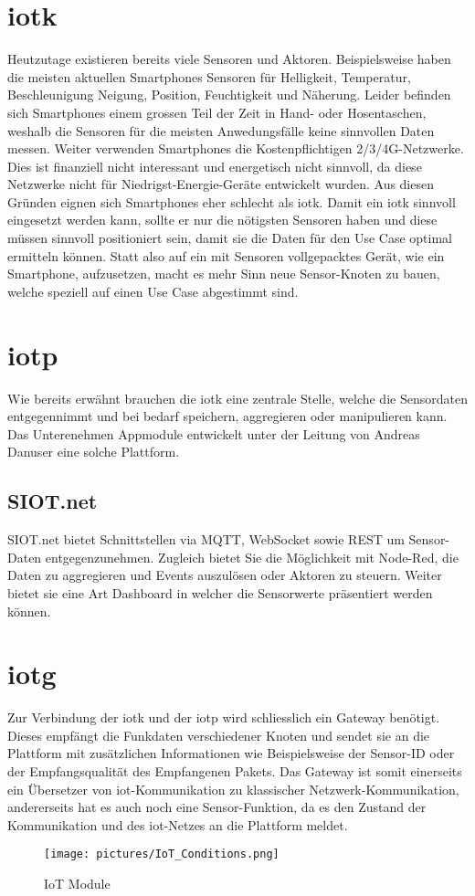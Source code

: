 \section{\gls{iotk}}
Heutzutage existieren bereits viele Sensoren und Aktoren. Beispielsweise haben die meisten aktuellen Smartphones Sensoren für Helligkeit, Temperatur, Beschleunigung Neigung, Position, Feuchtigkeit und Näherung. Leider befinden sich Smartphones einem grossen Teil der Zeit in Hand- oder Hosentaschen, weshalb die Sensoren für die meisten Anwedungsfälle keine sinnvollen Daten messen. Weiter verwenden  Smartphones die Kostenpflichtigen 2/3/4G-Netzwerke. Dies ist finanziell nicht interessant und energetisch nicht sinnvoll, da diese Netzwerke nicht für Niedrigst-Energie-Geräte entwickelt wurden. Aus diesen Gründen eignen sich Smartphones eher schlecht als \gls{iotk}. Damit ein \gls{iotk} sinnvoll eingesetzt werden kann, sollte er nur die nötigsten Sensoren haben und diese müssen sinnvoll positioniert sein, damit sie die Daten für den Use Case optimal ermitteln können. Statt also auf ein mit Sensoren vollgepacktes Gerät, wie ein Smartphone, aufzusetzen, macht es mehr Sinn neue Sensor-Knoten zu bauen, welche speziell auf einen Use Case abgestimmt sind.

\section{\gls{iotp}}
Wie bereits erwähnt brauchen die \gls{iotk} eine zentrale Stelle, welche die Sensordaten entgegennimmt und bei bedarf speichern, aggregieren oder manipulieren kann. Das Unterenehmen Appmodule entwickelt unter der Leitung von Andreas Danuser eine solche Plattform. 
\subsection{SIOT.net}
SIOT.net bietet Schnittstellen via MQTT, WebSocket sowie REST um Sensor-Daten entgegenzunehmen. Zugleich bietet Sie die Möglichkeit mit Node-Red, die Daten zu aggregieren und Events auszulösen oder Aktoren zu steuern. Weiter bietet sie eine Art Dashboard in welcher die Sensorwerte präsentiert werden können.

\section{\gls{iotg}}
Zur Verbindung der \gls{iotk} und der \gls{iotp} wird schliesslich ein Gateway benötigt. Dieses empfängt die Funkdaten verschiedener Knoten und sendet sie an die Plattform mit zusätzlichen Informationen wie Beispielsweise der Sensor-ID oder der Empfangsqualität des Empfangenen Pakets. Das Gateway ist somit einerseits ein Übersetzer von \gls{iot}-Kommunikation zu klassischer Netzwerk-Kommunikation, andererseits hat es auch noch eine Sensor-Funktion, da es den Zustand der Kommunikation und des \gls{iot}-Netzes an die Plattform meldet. 

\begin{figure}[H]
    \centering
        \texttt{[image: pictures/IoT\_Conditions.png]}
    \caption{IoT Module}
    \label{fig:IoT Module}
\end{figure}

